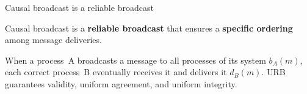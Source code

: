 \documentclass[10pt, xcolor={usenames, dvipsnames}]{beamer}
\begin{document}
\begin{frame}{Causal broadcast is a reliable broadcast}

  Causal broadcast is a \textbf{reliable broadcast} that ensures a
  \textbf{specific ordering} among message deliveries.
  
  \vspace{1em}

  \begin{definition} 
    When a process~A broadcasts a message to all processes of its system $b_A(m)$,
    each correct process~B eventually receives it and delivers it
    $d_B(m)$. URB guarantees validity, uniform agreement, and uniform integrity.
  \end{definition}

  \begin{minipage}{0.49\textwidth} %
      
  \end{minipage}~~~
  \begin{minipage}{0.49\textwidth} %
    \begin{center}
      
    \end{center}
  \end{minipage}
  
  

  
\end{frame}
\end{document}
